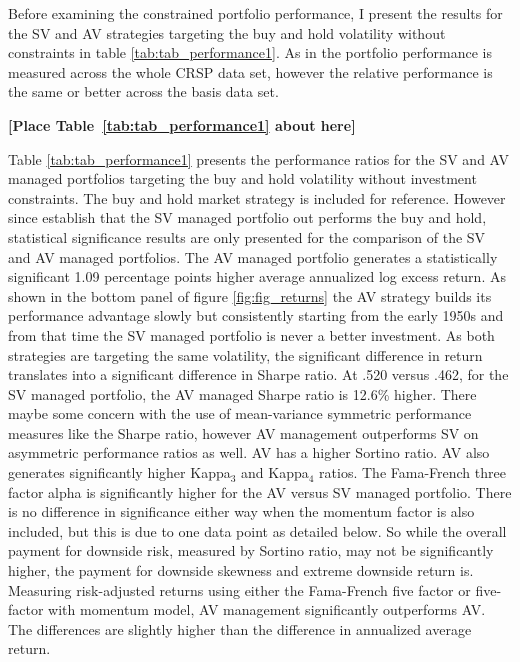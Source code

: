 Before examining the constrained portfolio performance, I present the results for the SV and AV strategies targeting the buy and hold volatility without constraints in table \ref{tab:tab_performance1}. As in \citet{moreira_volatility-managed_2017} the portfolio performance is measured across the whole CRSP data set, however the relative performance is the same or better across the basis data set. 

\bigskip
\centerline{\bf [Place Table~\ref{tab:tab_performance1} about here]}
\bigskip

Table \ref{tab:tab_performance1} presents the performance ratios for the SV and AV managed portfolios targeting the buy and hold volatility without investment constraints. The buy and hold market strategy is included for reference. However since \citet{moreira_volatility-managed_2017} establish that the SV managed portfolio out performs the buy and hold, statistical significance results are only presented for the comparison of the SV and AV managed portfolios. The AV managed portfolio generates a statistically significant 1.09 percentage points higher average annualized log excess return. As shown in the bottom panel of figure \ref{fig:fig_returns} the AV strategy builds its performance advantage slowly but consistently starting from the early 1950s and from that time the SV managed portfolio is never a better investment. As both strategies are targeting the same volatility, the significant difference in return translates into a significant difference in Sharpe ratio. At .520 versus .462, for the SV managed portfolio, the AV managed Sharpe ratio is 12.6\% higher. There maybe some concern with the use of mean-variance symmetric performance measures like the Sharpe ratio, however AV management outperforms SV on asymmetric performance ratios as well. AV has a higher Sortino ratio. AV also generates significantly higher Kappa$_{3}$ and Kappa$_{4}$ ratios. The Fama-French three factor alpha is significantly higher for the AV versus SV managed portfolio. There is no difference in significance either way when the momentum factor is also included, but this is due to one data point as detailed below. So while the overall payment for downside risk, measured by Sortino ratio, may not be significantly higher, the payment for downside skewness and extreme downside return is. Measuring risk-adjusted returns using either the Fama-French five factor or five-factor with momentum model, AV management significantly outperforms AV. The differences are slightly higher than the difference in annualized average return.%

